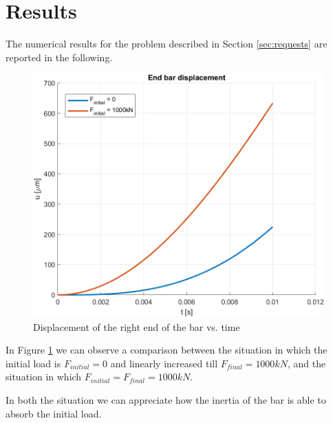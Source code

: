 \section{Results}
\label{sec:results}

The numerical results for the problem described in Section \ref{sec:requests} are reported in the following.

\begin{figure}[H]
    \centering
    \includegraphics[width=.8\textwidth]{img/end_bar_displacement}
    \caption{Displacement of the right end of the bar vs. time}
    \label{fig:final_displacement}
\end{figure}

In Figure \ref{fig:final_displacement} we can observe a comparison between the situation in which the initial load is $F_{initial} = 0$ and linearly increased till $F_{final} = 1000kN$, and the situation in which $F_{initial} = F_{final} = 1000kN$.

In both the situation we can appreciate how the inertia of the bar is able to absorb the initial load.
